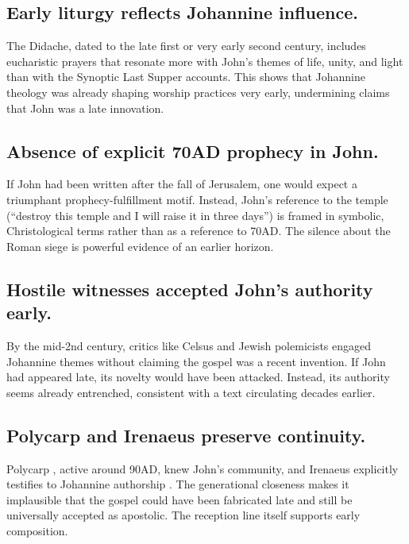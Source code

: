 \subsection{Early liturgy reflects Johannine influence.}\label{subsec:early-liturgy-reflects-johannine-influence.}

The Didache, dated to the late first or very early second century, includes eucharistic prayers that resonate more with John’s themes of life, unity, and light than with the Synoptic Last Supper accounts.
This shows that Johannine theology was already shaping worship practices very early, undermining claims that John was a late innovation.

\subsection{Absence of explicit 70AD prophecy in John.}\label{subsec:absence-of-explicit-70ad-prophecy-in-john.}

If John had been written after the fall of Jerusalem, one would expect a triumphant prophecy-fulfillment motif.
Instead, John’s reference to the temple (“destroy this temple and I will raise it in three days”) is framed in symbolic, Christological terms rather than as a reference to 70AD.
The silence about the Roman siege is powerful evidence of an earlier horizon.

\subsection{Hostile witnesses accepted John’s authority early.}\label{subsec:hostile-witnesses-accepted-johns-authority-early.}

By the mid-2nd century, critics like Celsus \cite{origen:contracels} and Jewish polemicists engaged Johannine themes without claiming the gospel was a recent invention.
If John had appeared late, its novelty would have been attacked.
Instead, its authority seems already entrenched, consistent with a text circulating decades earlier.

\subsection{Polycarp and Irenaeus preserve continuity.}\label{subsec:polycarp-and-irenaeus-preserve-continuity.}

Polycarp \cite{polycarp:philippians}, active around 90AD, knew John's community, and Irenaeus explicitly testifies to Johannine authorship \cite[3.1.1]{irenaeus:advhaer}.
The generational closeness makes it implausible that the gospel could have been fabricated late and still be universally accepted as apostolic.
The reception line itself supports early composition.


